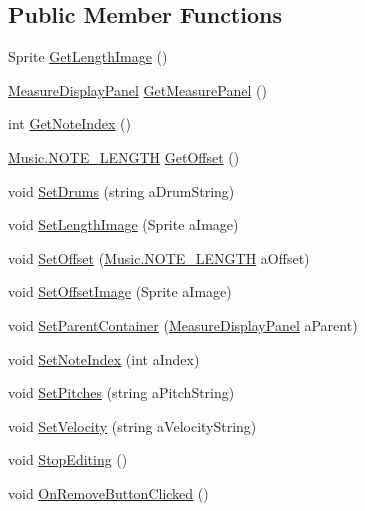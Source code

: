 \subsection*{Public Member Functions}
\begin{DoxyCompactItemize}
\item 
Sprite \hyperlink{class_song_creation_1_1_note_display_panel_aa53de786e5bd8e0d7b00ad1142cdf9df}{Get\+Length\+Image} ()
\item 
\hyperlink{class_song_creation_1_1_measure_display_panel}{Measure\+Display\+Panel} \hyperlink{class_song_creation_1_1_note_display_panel_a9b9552bd8601886993f39540f9378fc4}{Get\+Measure\+Panel} ()
\item 
int \hyperlink{class_song_creation_1_1_note_display_panel_ac3736184f5991e2d24e408245dc62cdb}{Get\+Note\+Index} ()
\item 
\hyperlink{group___music_enums_gaf11b5f079adbb21c800b9eca1c5c3cbd}{Music.\+N\+O\+T\+E\+\_\+\+L\+E\+N\+G\+TH} \hyperlink{class_song_creation_1_1_note_display_panel_a804d1fc14c1ca14ebf5b37b122b1faf0}{Get\+Offset} ()
\item 
void \hyperlink{class_song_creation_1_1_note_display_panel_a1ab979ae56d06b4680b9d37ed09d40c1}{Set\+Drums} (string a\+Drum\+String)
\item 
void \hyperlink{class_song_creation_1_1_note_display_panel_a51376b7beedfd9afdc8574b1ca9f47fa}{Set\+Length\+Image} (Sprite a\+Image)
\item 
void \hyperlink{class_song_creation_1_1_note_display_panel_aeeaa559c542f89fcecc4fc46df83fa06}{Set\+Offset} (\hyperlink{group___music_enums_gaf11b5f079adbb21c800b9eca1c5c3cbd}{Music.\+N\+O\+T\+E\+\_\+\+L\+E\+N\+G\+TH} a\+Offset)
\item 
void \hyperlink{class_song_creation_1_1_note_display_panel_a66f6128629d7ced83d0c1803dbfae813}{Set\+Offset\+Image} (Sprite a\+Image)
\item 
void \hyperlink{class_song_creation_1_1_note_display_panel_ad1c95108009b17e0fb0368fc35f362a8}{Set\+Parent\+Container} (\hyperlink{class_song_creation_1_1_measure_display_panel}{Measure\+Display\+Panel} a\+Parent)
\item 
void \hyperlink{class_song_creation_1_1_note_display_panel_a7247d36ccbd7449be872432bf1ad7781}{Set\+Note\+Index} (int a\+Index)
\item 
void \hyperlink{class_song_creation_1_1_note_display_panel_a0f00b32c3c5d6c1bf80e8896388e2099}{Set\+Pitches} (string a\+Pitch\+String)
\item 
void \hyperlink{class_song_creation_1_1_note_display_panel_afcaffdbcc0458ee580b8c8d1373683d7}{Set\+Velocity} (string a\+Velocity\+String)
\item 
void \hyperlink{class_song_creation_1_1_note_display_panel_a75afc179723dc73d1f7715808f453dd1}{Stop\+Editing} ()
\item 
void \hyperlink{class_song_creation_1_1_note_display_panel_a496b2c412d05d2816dd733eeef4caa61}{On\+Remove\+Button\+Clicked} ()
\end{DoxyCompactItemize}
